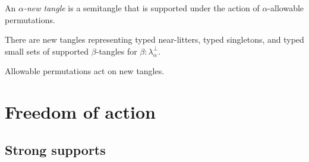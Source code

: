 \documentclass{article}
\begin{document}
\begin{definition}
    An \emph{\( \alpha \)-new tangle} is a semitangle that is supported under the action of \( \alpha \)-allowable permutations.
\end{definition}
\begin{lemma}
    There are new tangles representing typed near-litters, typed singletons, and typed small sets of supported \( \beta \)-tangles for \( \beta : \lambda_\alpha^\bot \).
\end{lemma}
\begin{lemma}
    Allowable permutations act on new tangles.
\end{lemma}

\section{Freedom of action}

\subsection{Strong supports}
\end{document}
